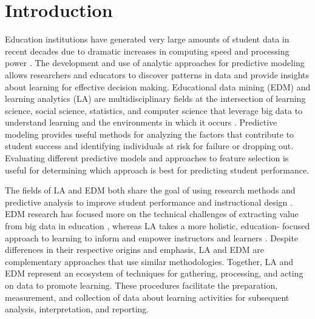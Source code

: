 \documentclass[sigconf]{acmart}
\begin{document}
\section{Introduction}

Education institutions have generated very large amounts of student data in 
recent decades due to dramatic increases in computing speed and processing power 
\cite{daniel15, daniel16}. The development and use of analytic approaches for 
predictive modeling allows researchers and educators to discover patterns in 
data and provide insights about learning for effective decision making. 
Educational data mining (EDM) and learning analytics (LA) are multidisciplinary 
fields at the intersection of learning science, social science, statistics, and 
computer science that leverage big data to understand learning and the 
environments in which it occurs \cite{siemens13, siemensbaker12}. Predictive 
modeling provides useful methods for analyzing the factors that contribute to 
student success and identifying individuals at risk for failure or dropping out. 
Evaluating different predictive models and approaches to feature selection is 
useful for determining which approach is best for predicting student performance. 


The fields of LA and EDM both share the goal of using research methods and
predictive analysis to improve student performance and instructional design 
\cite{baker09, ferguson12, lester19}. EDM research has focused more on the 
technical challenges of extracting value from big data in education 
\cite{penaAyala14, romero10}, whereas LA takes a more holistic, education-
focused approach to learning to inform and empower instructors and learners 
\cite{lang17, papamitsiou14}. Despite differences in their respective origins 
and emphasis, LA and EDM are complementary approaches that use similar 
methodologies. Together, LA and EDM represent an ecosystem of techniques for 
gathering, processing, and acting on data to promote learning. These procedures 
facilitate the preparation, measurement, and collection of data about learning 
activities for subsequent analysis, interpretation, and reporting. 

\end{document}
